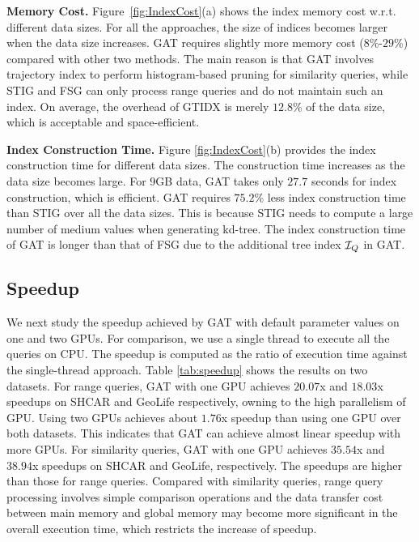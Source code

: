 \documentclass[10pt,conference,letterpaper]{IEEEtran}
\newcommand{\frname}{GAT\xspace }
\newcommand{\idxname}{GTIDX\xspace }
\newcommand{\treeindex}{{{\cal I}_Q}\xspace}
\begin{document}
\vspace{0.1cm}\textbf{Memory Cost.}
Figure~\ref{fig:IndexCost}(a) shows the index memory cost w.r.t. different data sizes.
For all the approaches, the size of indices becomes larger when the data size increases.
\frname requires slightly more memory cost ($8$\%-$29$\%) compared with other two methods.
The main reason is that \frname involves trajectory index to perform histogram-based pruning for similarity queries, while STIG and FSG can only process range queries and do not maintain such an index.
On average, the overhead of \idxname is merely $12.8$\% of the data size, which is acceptable and space-efficient.

\vspace{0.1cm}\textbf{Index Construction Time.}
Figure \ref{fig:IndexCost}(b) provides the index construction time for different data sizes.
The construction time increases as the data size becomes large. For 9GB data, \frname takes only $27.7$ seconds for index construction, which is efficient.
\frname requires $75.2$\% less index construction time than STIG over all the data sizes. This is because STIG needs to compute a large number of medium values when generating kd-tree.
The index construction time of \frname is longer than that of FSG due to the additional tree index $\treeindex$ in \frname.


\subsection{Speedup}

We next study the speedup achieved by \frname with default parameter values on one and two GPUs. For comparison, we use a single thread to execute all the queries on CPU. The speedup is computed as the ratio of execution time against the single-thread approach.
Table \ref{tab:speedup} shows the results on two datasets.
%
For range queries, \frname with one GPU achieves $20.07$x and $18.03$x speedups on SHCAR and GeoLife respectively, owning to the high parallelism of GPU. Using two GPUs achieves about $1.76$x speedup than using one GPU over both datasets. This indicates that \frname can achieve almost linear speedup with more GPUs.
%
For similarity queries, \frname with one GPU achieves $35.54$x and $38.94$x speedups on SHCAR and GeoLife, respectively. The speedups are higher than those for range queries. Compared with similarity queries, range query processing involves simple comparison operations and the data transfer cost between main memory and global memory may become more significant in the overall execution time, which restricts the increase of speedup.
\end{document}
